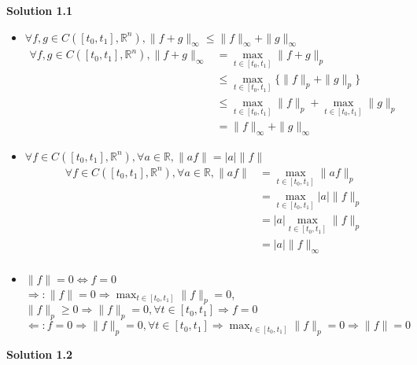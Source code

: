 \documentclass[a4paper,10.5pt]{article}
\newcommand{\R}{\mathbb{R}}
\newcommand{\abs}[1]{\left|#1\right|}
\begin{document}
\clearpage

\noindent \textbf {Solution 1.1} \\
\begin{itemize}
	\item $\forall f, g \in C([t_0, t_1], \R^n), \|f+g\|_\infty \leq \|f\|_\infty + \|g\|_\infty$
	\begin{align*}
		\forall f, g \in C([t_0, t_1], \R^n), \|f+g\|_\infty &= \max_{t \in [t_0, t_1]} \| f + g\|_p \\
		&\leq  \max_{t \in [t_0, t_1]} \{\| f \|_p + \|g\|_p\} \\
		&\leq \max_{t \in [t_0, t_1]} \| f \|_p + \max_{t \in [t_0, t_1]} \|g\|_p \\
		&= \|f\|_\infty + \|g\|_\infty
	\end{align*}
	\item $\forall f \in C([t_0, t_1], \R^n), \forall a \in \R, \|af\| = \abs{a}\|f\|$
	\begin{align*}
		\forall f \in C([t_0, t_1], \R^n), \forall a \in \R, \|af\| &= \max_{t \in [t_0, t_1]} \| af \|_p \\
		&= \max_{t \in [t_0, t_1]} \abs{a} \| f \|_p \\
		&= \abs{a} \max_{t \in [t_0, t_1]} \| f \|_p \\
		&= \abs{a} \| f \|_\infty \\
	\end{align*}
	\item $\|f\|=0 \Leftrightarrow f = 0$ \\
	$\Rightarrow: \|f\|=0\Rightarrow\max_{t \in [t_0, t_1]} \| f \|_p = 0$, $\|f\|_p \geq 0 \Rightarrow \|f\|_p = 0, \forall t \in [t_0, t_1] \Rightarrow f = 0$ \\
	$\Leftarrow: f = 0 \Rightarrow \|f\|_p = 0, \forall t \in [t_0, t_1] \Rightarrow \max_{t \in [t_0, t_1]} \| f \|_p = 0 \Rightarrow \|f\|=0$ \\
\end{itemize} 

\noindent \textbf {Solution 1.2} \\
\end{document}
